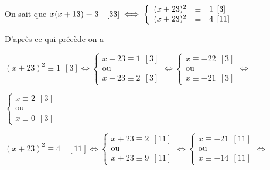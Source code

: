 \documentclass[11pt,a4paper,answers,fancyhdr]{exam}
\newcommand{\equi}{\Longleftrightarrow}
\newcommand{\x}{\times}
\begin{document}
\begin{enumerate}
\begin{enumerate}

\begin{solution}

On sait que $x(x + 13) \equiv 3\quad [33] \iff  \left\{\begin{array}{l c l}
(x + 23)^2 &\equiv&1 \:\: [3]\\
(x + 23)^2 &\equiv& 4 \:\:[11]
\end{array}\right.$

D'après ce qui précède on a 

$(x+23)^2\equiv 1\:\:[3] \equi \begin{cases}
x+23 \equiv 1\:\:[3]\\\text{ou}\\x+23 \equiv 2\:\:[3]
\end{cases}\equi \begin{cases}
x \equiv -22\:\:[3]\\\text{ou}\\x \equiv -21\:\:[3]
\end{cases} \equi $

$\begin{cases}
x \equiv 2\:\:[3]\\\text{ou}\\x \equiv 0\:\:[3]
\end{cases}$

$(x+23)^2\equiv 4\quad[11] \equi \begin{cases}
x+23 \equiv 2\:\:[11]\\\text{ou}\\x+23 \equiv 9\:\:[11]
\end{cases}\equi \begin{cases}
x \equiv -21\:\:[11]\\\text{ou}\\x \equiv -14\:\:[11]
\end{cases} \equi $


\end{solution}
\end{enumerate}
\end{enumerate}
\end{document}
